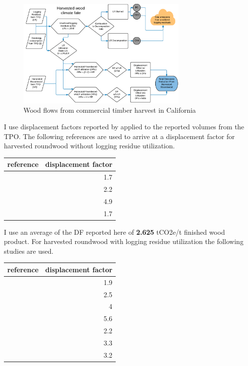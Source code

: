 \documentclass[a4paper]{article}
\begin{document}
\begin{figure}[htb]
\centering
\includegraphics[width=0.75\textwidth]{./graphics/flow_chart.pdf}
\caption{Wood flows from commercial timber harvest in California \label{fig:flow_chart}}
\end{figure}

I use displacement factors reported by \cite{Sathre2010} applied to the
reported volumes from the TPO. The following references are used to
arrive at a displacement factor for harvested roundwood without
logging residue utilization.

\begin{center}
\begin{tabular}{lr}
reference & displacement factor\\
\hline
\citet{Eriksson2007} & 1.7\\
\citet{Eriksson2007} & 2.2\\
\citet{Salazar2009} & 4.9\\
\citet{Werner2005} & 1.7\\
\end{tabular}

\end{center}

I use an average of the DF reported here of \textbf{2.625} tCO2e/t finished
wood product. For harvested roundwood with logging residue utilization the following
studies are used.

\begin{center}
\begin{tabular}{lr}
reference & displacement factor\\
\hline
\citet{Eriksson2007} & 1.9\\
\citet{Eriksson2007} & 2.5\\
\citet{Gustavsson2006a} & 4\\
\citet{Gustavsson2006a} & 5.6\\
\citet{Gustavsson2006a} & 2.2\\
\citet{Gustavsson2006a} & 3.3\\
\citet{Pingoud2001} & 3.2\\
\end{tabular}

\end{center}
\end{document}
